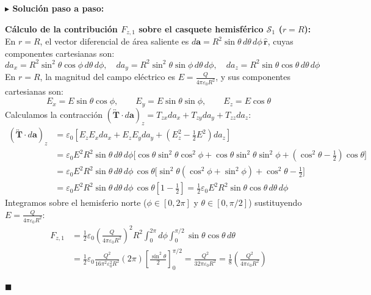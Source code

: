 \documentclass[11pt,a4paper]{book}
\newenvironment{solucion}{%
    \par\medskip\noindent\textbf{\color{blue!65!black}\Large $\blacktriangleright$ Solución paso a paso:}\par\medskip
}{%
    \hfill$\blacksquare$\par\bigskip
}
\newcommand{\rhat}{\hat{\bm{r}}}
\begin{document}
\begin{solucion}
\textbf{Cálculo de la contribución $F_{z,1}$ sobre el casquete hemisférico $\mathcal{S}_1$ ($r = R$):}
En $r = R$, el vector diferencial de área saliente es $d\bm{a} = R^2\sin\theta\,d\theta\,d\phi\,\rhat$, cuyas componentes cartesianas son:
\begin{equation}
    da_x = R^2\sin^2\theta\cos\phi\,d\theta\,d\phi, \quad da_y = R^2\sin^2\theta\sin\phi\,d\theta\,d\phi, \quad da_z = R^2\sin\theta\cos\theta\,d\theta\,d\phi
\end{equation}
En $r = R$, la magnitud del campo eléctrico es $E = \frac{Q}{4\pi\varepsilon_0 R^2}$, y sus componentes cartesianas son:
\begin{equation}
    E_x = E\sin\theta\cos\phi, \qquad E_y = E\sin\theta\sin\phi, \qquad E_z = E\cos\theta
\end{equation}
Calculamos la contracción $(\overleftrightarrow{\bm{T}}\cdot d\bm{a})_z = T_{zx}da_x + T_{zy}da_y + T_{zz}da_z$:
\begin{align}
    (\overleftrightarrow{\bm{T}}\cdot d\bm{a})_z &= \varepsilon_0 \left[ E_z E_x da_x + E_z E_y da_y + \left(E_z^2 - \frac{1}{2}E^2\right) da_z \right] \nonumber \\
    &= \varepsilon_0 E^2 R^2\sin\theta\,d\theta\,d\phi \Big[ \cos\theta\sin^2\theta\cos^2\phi + \cos\theta\sin^2\theta\sin^2\phi + \left(\cos^2\theta - \frac{1}{2}\right)\cos\theta \Big] \nonumber \\
    &= \varepsilon_0 E^2 R^2\sin\theta\,d\theta\,d\phi \, \cos\theta \Big[ \sin^2\theta(\cos^2\phi + \sin^2\phi) + \cos^2\theta - \frac{1}{2} \Big] \nonumber \\
    &= \varepsilon_0 E^2 R^2\sin\theta\,d\theta\,d\phi \, \cos\theta \left[ 1 - \frac{1}{2} \right] = \frac{1}{2}\varepsilon_0 E^2 R^2 \sin\theta\cos\theta\,d\theta\,d\phi
\end{align}
Integramos sobre el hemisferio norte ($\phi \in [0,2\pi]$ y $\theta \in [0,\pi/2]$) sustituyendo $E = \frac{Q}{4\pi\varepsilon_0 R^2}$:
\begin{align}
    F_{z,1} &= \frac{1}{2}\varepsilon_0 \left(\frac{Q}{4\pi\varepsilon_0 R^2}\right)^2 R^2 \int_{0}^{2\pi} d\phi \int_{0}^{\pi/2} \sin\theta\cos\theta\,d\theta \nonumber \\
    &= \frac{1}{2}\varepsilon_0 \frac{Q^2}{16\pi^2\varepsilon_0^2 R^2} (2\pi) \left[ \frac{\sin^2\theta}{2} \right]_{0}^{\pi/2} = \frac{Q^2}{32\pi\varepsilon_0 R^2} = \frac{1}{8}\left(\frac{Q^2}{4\pi\varepsilon_0 R^2}\right)
\end{align}


\end{solucion}
\end{document}
